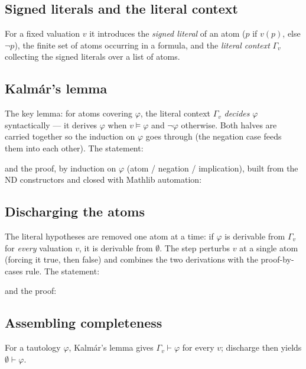 \documentclass[11pt]{article}
\newcommand{\Not}{\neg}
\newcommand{\Prov}{\vdash}
\begin{document}
\subsection{Signed literals and the literal context}
For a fixed valuation $v$ it introduces the \emph{signed literal} of an atom ($p$ if $v(p)$, else
$\Not p$), the finite set of atoms occurring in a formula, and the \emph{literal context}
$\Gamma_v$ collecting the signed literals over a list of atoms.


\subsection{Kalmár's lemma}
The key lemma: for atoms covering $\varphi$, the literal context $\Gamma_v$ \emph{decides} $\varphi$
syntactically --- it derives $\varphi$ when $v\models\varphi$ and $\Not\varphi$ otherwise. Both halves
are carried together so the induction on $\varphi$ goes through (the negation case feeds them into
each other). The statement:

\noindent and the proof, by induction on $\varphi$ (atom / negation / implication), built from the
ND constructors and closed with Mathlib automation:


\subsection{Discharging the atoms}
The literal hypotheses are removed one atom at a time: if $\varphi$ is derivable from $\Gamma_v$ for
\emph{every} valuation $v$, it is derivable from $\emptyset$. The step perturbs $v$ at a single atom
(forcing it true, then false) and combines the two derivations with the proof-by-cases rule. The
statement:

\noindent and the proof:


\subsection{Assembling completeness}
For a tautology $\varphi$, Kalmár's lemma gives $\Gamma_v \Prov \varphi$ for every $v$; discharge then
yields $\emptyset \Prov \varphi$.

\end{document}
